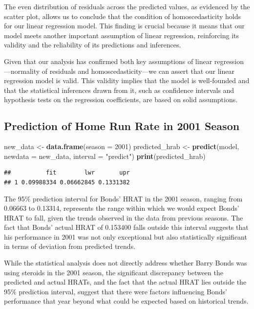 \documentclass[
]{article}
\newenvironment{Shaded}{\begin{snugshade}}{\end{snugshade}}
\newcommand{\AttributeTok}[1]{\textcolor[rgb]{0.13,0.29,0.53}{#1}}
\newcommand{\DecValTok}[1]{\textcolor[rgb]{0.00,0.00,0.81}{#1}}
\newcommand{\FunctionTok}[1]{\textcolor[rgb]{0.13,0.29,0.53}{\textbf{#1}}}
\newcommand{\NormalTok}[1]{#1}
\newcommand{\OtherTok}[1]{\textcolor[rgb]{0.56,0.35,0.01}{#1}}
\newcommand{\StringTok}[1]{\textcolor[rgb]{0.31,0.60,0.02}{#1}}
\begin{document}
The even distribution of residuals across the predicted values, as
evidenced by the scatter plot, allows us to conclude that the condition
of homoscedasticity holds for our linear regression model. This finding
is crucial because it means that our model meets another important
assumption of linear regression, reinforcing its validity and the
reliability of its predictions and inferences.

Given that our analysis has confirmed both key assumptions of linear
regression---normality of residuals and homoscedasticity---we can assert
that our linear regression model is valid. This validity implies that
the model is well-founded and that the statistical inferences drawn from
it, such as confidence intervals and hypothesis tests on the regression
coefficients, are based on solid assumptions.

\subsection{Prediction of Home Run Rate in 2001
Season}\label{prediction-of-home-run-rate-in-2001-season}

\begin{Shaded}
\begin{Highlighting}[]
\NormalTok{new\_data }\OtherTok{\textless{}{-}} \FunctionTok{data.frame}\NormalTok{(}\AttributeTok{season =} \DecValTok{2001}\NormalTok{)}
\NormalTok{predicted\_hrab }\OtherTok{\textless{}{-}} \FunctionTok{predict}\NormalTok{(model, }\AttributeTok{newdata =}\NormalTok{ new\_data, }\AttributeTok{interval =} \StringTok{"predict"}\NormalTok{)}
\FunctionTok{print}\NormalTok{(predicted\_hrab)}
\end{Highlighting}
\end{Shaded}

\begin{verbatim}
##          fit        lwr       upr
## 1 0.09988334 0.06662845 0.1331382
\end{verbatim}

The 95\% prediction interval for Bonds' HRAT in the 2001 season, ranging
from 0.06663 to 0.13314, represents the range within which we would
expect Bonds' HRAT to fall, given the trends observed in the data from
previous seasons. The fact that Bonds' actual HRAT of 0.153400 falls
outside this interval suggests that his performance in 2001 was not only
exceptional but also statistically significant in terms of deviation
from predicted trends.

While the statistical analysis does not directly address whether Barry
Bonds was using steroids in the 2001 season, the significant discrepancy
between the predicted and actual HRATs, and the fact that the actual
HRAT lies outside the 95\% prediction interval, suggest that there were
factors influencing Bonds' performance that year beyond what could be
expected based on historical trends.
\end{document}
